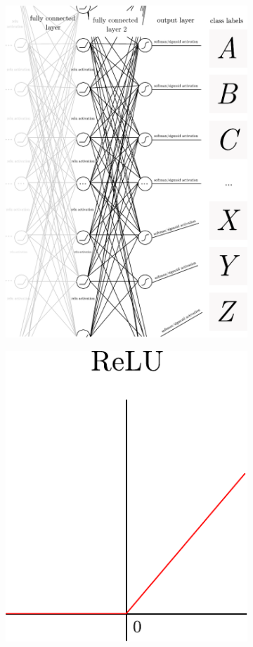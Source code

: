 \documentclass[report, 11pt, oneside]{dissertation}
\begin{document}
\begin{figure}[!htb]
	\begin{subfigure}{0.5\textwidth}
		\centering
		\includegraphics[scale=0.45]{figure_11.pdf}
	\end{subfigure}
	\begin{subfigure}{0.5\textwidth}
		\centering
		\includegraphics[scale=0.65]{figure_12.pdf}

\end{subfigure}
\end{figure}
\end{document}
